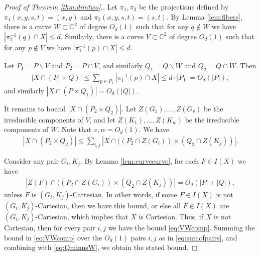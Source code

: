 \documentclass{daj}
\newtheorem{theorem}{Theorem}[section]
\theoremstyle{definition}
\newcommand{\C}{\mathbb C}
\begin{document}
\begin{proof}[Proof of Theorem \ref{thm:dimtwo}.]
Let $\pi_1,\pi_2$ be the projections defined by $\pi_1(x,y,s,t)=(x,y)$ and $\pi_2(x,y,s,t)=(s,t)$. 
By  Lemma \ref{lem:fibers}, there is a curve $W\subset \mathbb{C}^2$ of degree $O_d(1)$ such that for any $q\notin W$ we have $|\pi_2^{-1}(q)\cap X| \leq d$.
Similarly, there is a curve $V\subset \mathbb{C}^2$ of degree $O_d(1)$ such that for any $p\notin V$ we have $|\pi_1^{-1}(p)\cap X| \leq d$.

Let $P_1 = P\backslash V$ and $P_2 = P\cap V$, and similarly $Q_1 = Q\backslash W$ and $Q_2 = Q\cap W$.
Then
\begin{align}\label{eq:QminusW}
|X\cap (P_1\times Q)|\leq\sum_{p\in P_1} |\pi_1^{-1}(p)\cap X| \leq d\cdot |P_1| = O_d( |P|),
\end{align}
and similarly $|X\cap (P\times Q_1)|=O_d( |Q|)$.

It remains to bound $|X\cap (P_2\times Q_2)|$.
Let $Z(G_1),\ldots, Z(G_v)$ be the irreducible components of $V$, and let $Z(K_1),\ldots, Z(K_w)$ be the irreducible components of $W$.
Note that $v,w = O_d(1)$.
We have
\begin{align}\label{eq:sumofpairs}
|X\cap (P_2\times Q_2)| \leq \sum_{i,j}|X\cap ((P_2\cap Z(G_i))\times (Q_2\cap Z(K_j))| .
\end{align}

Consider any pair $G_i, K_j$.
By Lemma \ref{lem:curvecurve}, for each $F\in I(X)$ we have
\begin{align}\label{eq:VWcomp}
 |Z(F)\cap ((P_2\cap Z(G_i))\times (Q_2\cap Z(K_j))| = O_d(|P|+|Q|),
\end{align}
unless $F$ is $(G_i,K_j)$-Cartesian.
In other words, if some $F\in I(X)$ is not $(G_i,K_j)$-Cartesian, then we have this bound, or else all $F\in I(X)$ are $(G_i,K_j)$-Cartesian, which implies that $X$ is Cartesian.
Thus, if $X$ is not Cartesian, then for every pair $i,j$ we have the bound \eqref{eq:VWcomp}.
Summing the bound in \eqref{eq:VWcomp} over the $O_d(1)$ pairs $i,j$ as in \eqref{eq:sumofpairs}, and combining with \eqref{eq:QminusW}, we obtain the stated bound.
\end{proof}
\end{document}
